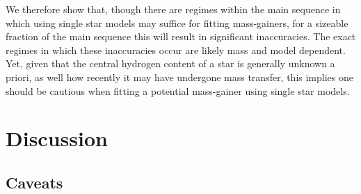 \documentclass[twocolumn, twocolappendix, oneside]{aastex631}
\makeatletter
\newcommand{\unit}[1]{%
    \,\mathrm{#1}\checknextarg}
\newcommand{\checknextarg}{\@ifnextchar\bgroup{\gobblenextarg}{}}
\newcommand{\gobblenextarg}[1]{\,\mathrm{#1}\@ifnextchar\bgroup{\gobblenextarg}{}}
\newif\ifstartedinmathmode
\newcommand{\msun}{%
  \relax\ifmmode\startedinmathmodetrue\else\startedinmathmodefalse\fi
  {\ifstartedinmathmode\unit{M_{\odot}}\else$\unit{M_{\odot}}$\fi}\xspace%
}
\newif\ifstartedinmathmode
\makeatother
\begin{document}

We therefore show that, though there are regimes within the main sequence in which using single star models may suffice for fitting mass-gainers, for a sizeable fraction of the main sequence this will result in significant inaccuracies. The exact regimes in which these inaccuracies occur are likely mass and model dependent. Yet, given that the central hydrogen content of a star is generally unknown a priori, as well how recently it may have undergone mass transfer, this implies one should be cautious when fitting a potential mass-gainer using single star models.

\section{Discussion}

\subsection{Caveats}\label{sec:caveats}
\end{document}
